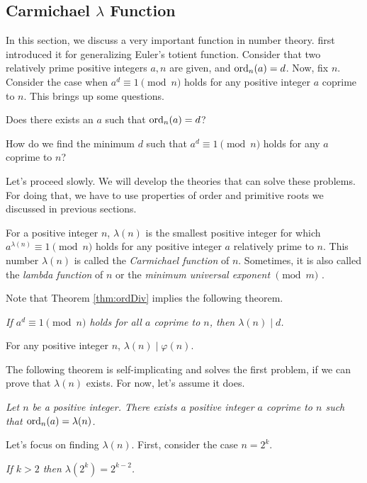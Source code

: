 \documentclass{subfile}
\begin{document}
	\subsection{Carmichael $\lambda$ Function}
	In this section, we discuss a very important function in number theory. \textcite{carmichael1910} first introduced it for generalizing Euler's totient function. Consider that two relatively prime positive integers $a,n$ are given, and $\operatorname{ord}_n(a)=d$. Now, fix $n$. Consider the case when $a^d\equiv1\pmod n$ holds for any positive integer $a$ coprime to $n$. This brings up some questions.
	\begin{problem}\label{prob:CarmichaelQuestion1}
		Does there exists an $a$ such that $\operatorname{ord}_n(a)=d$?
	\end{problem}
	
	\begin{problem}\label{prob:CarmichaelQuestion2}
		How do we find the minimum $d$ such that $a^d\equiv1\pmod n$ holds for any $a$ coprime to $n$?
	\end{problem}
	Let's proceed slowly. We will develop the theories that can solve these problems. For doing that, we have to use properties of order and primitive roots we discussed in previous sections.
	\begin{definition}
		For a positive integer $n$, $\lambda(n)$ is the smallest positive integer for which $a^{\lambda(n)}\equiv1\pmod n$ holds for any positive integer $a$ relatively prime to $n$. This number $\lambda(n)$ is called the \textit{Carmichael function} of $n$. Sometimes, it is also called the \textit{lambda function} of $n$ or the \textit{minimum universal exponent} $\pmod m$ \citep[Chapter $\S$VI, Section $4$, Page $265$]{sierpinski_schinzel_1988}.
	\end{definition}
	Note that Theorem \eqref{thm:ordDiv} implies the following theorem.
	\begin{theorem}\slshape\label{thm:carDiv}
		If $a^d\equiv1\pmod n$ holds for all $a$ coprime to $n$, then $\lambda(n)\mid d$.
	\end{theorem}
	
	\begin{corollary}\label{cor:LambdaDividesPhi}
		For any positive integer $n$, $\lambda(n)\mid \varphi(n)$.
	\end{corollary}
	The following theorem is self-implicating and solves the first problem, if we can prove that $\lambda(n)$ exists. For now, let's assume it does.
	\begin{theorem}\slshape
		Let $n$ be a positive integer. There exists a positive integer $a$ coprime to $n$ such that $\operatorname{ord}_n(a)=\lambda(n)$.
	\end{theorem}
	Let's focus on finding $\lambda(n)$. First, consider the case $n=2^k$.
	\begin{theorem}\slshape
		If $k>2$ then $\lambda(2^k)=2^{k-2}$.
	\end{theorem}
	
\end{document}
